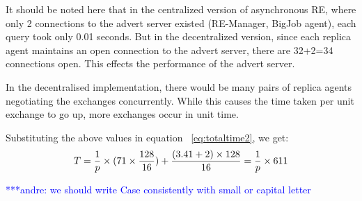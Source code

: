 \documentclass{rspublic}
\newcommand{\jhanote}[1]{ {\textcolor{red} { ***shantenu: #1 }}}
\newcommand{\alnote}[1]{ {\textcolor{blue} { ***andre: #1 }}}
\newcommand{\alnote}[1]{}
\newcommand{\jhanote}[1]{}
\begin{document}
It should be noted here that in the centralized version of
asynchronous RE, where only 2 connections to the advert server existed
(RE-Manager, BigJob agent), each query took only 0.01 seconds. But in
the decentralized version, since each replica agent maintains an open
connection to the advert server, there are 32+2=34 connections
open. This effects the performance of the advert server.

In the decentralised implementation, there would be many pairs of
replica agents negotiating the exchanges concurrently. While this
causes the time taken per unit exchange to go up, more exchanges occur
in unit time.


Substituting the above values in equation
~\ref{eq:totaltime2}, we get:
\begin{eqnarray}
T=  {1 \over p} \times {{(71\times {128\over 16}}) + {(3.41+2)\times 128\over 16}} = {1 \over p} \times 611
\label{eq:decent}
\end{eqnarray}




\alnote{we should write Case consistently with small or capital letter}
\end{document}
